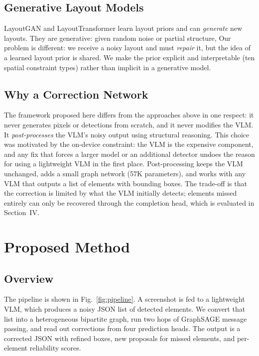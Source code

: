 \documentclass[11pt, letterpaper]{article}
\begin{document}
\subsection{Generative Layout Models}
LayoutGAN \cite{li2019layoutgan} and LayoutTransformer
\cite{gupta2021layouttransformer} learn layout priors and can \emph{generate}
new layouts. They are generative: given random noise or partial structure,
Our problem is different: we receive a
noisy layout and must \emph{repair} it, but the idea of a learned layout
prior is shared. We make the prior explicit and interpretable (ten spatial
constraint types) rather than implicit in a generative model.

\subsection{Why a Correction Network}
The framework proposed here differs from the approaches above in one
respect: it never generates pixels or detections from scratch, and it never
modifies the VLM. It \emph{post-processes} the VLM's noisy output using
structural reasoning. This choice was motivated by the on-device constraint:
the VLM is the expensive component, and any fix that forces a larger model or
an additional detector undoes the reason for using a lightweight VLM in the
first place. Post-processing keeps the VLM unchanged, adds a small graph
network (57K parameters), and works with any VLM that outputs a list of
elements with bounding boxes. The trade-off is that the correction is limited
by what the VLM initially detects; elements missed entirely can only be
recovered through the completion head, which is evaluated in Section~IV.

\section{Proposed Method}
\subsection{Overview}
The pipeline is shown in Fig.~\ref{fig:pipeline}. A screenshot is fed to a
lightweight VLM, which produces a noisy JSON list of detected elements. We
convert that list into a heterogeneous bipartite graph, run two hops of
GraphSAGE message passing, and read out corrections from four prediction
heads. The output is a corrected JSON with refined boxes, new proposals for
missed elements, and per-element reliability scores.
\end{document}
